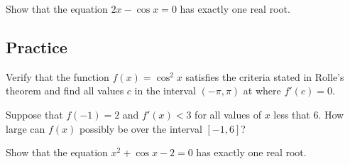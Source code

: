 \begin{example}

Show that the equation \(2x-\cos x=0\) has exactly one real root.

\end{example}
\vspace*{6\baselineskip}

\subsection{Practice}

\begin{exercise}

Verify that the function \(f(x)=\cos^2x\) satisfies the criteria stated
in Rolle's theorem and find all values \(c\) in the interval
\((-\pi, \pi)\) at where \(f'(c)=0\).

\end{exercise}
\vspace*{6\baselineskip}

\begin{exercise}

Suppose that \(f(-1)=2\) and \(f'(x)<3\) for all values of \(x\) less
that 6. How large can \(f(x)\) possibly be over the interval $[-1, 6]$?

\end{exercise}
\vspace*{6\baselineskip}

\begin{exercise}

Show that the equation \(x^2 + \cos x - 2=0\) has exactly one real root.

\end{exercise}

